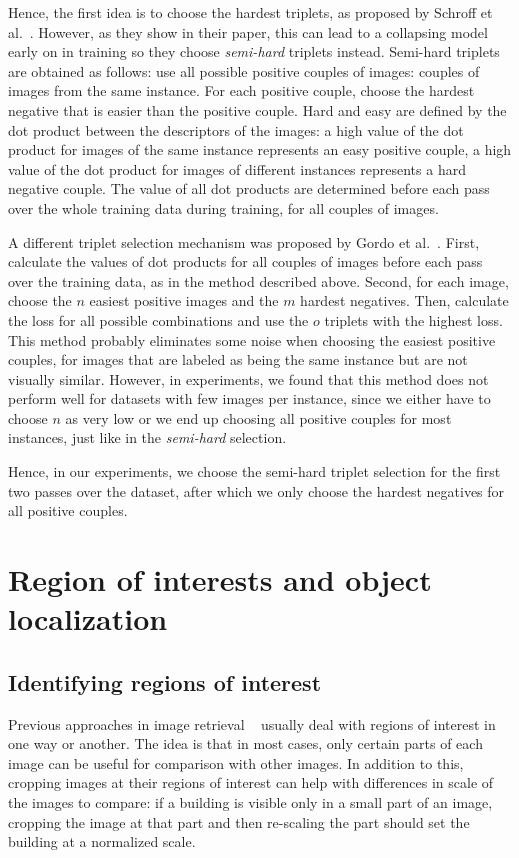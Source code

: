Hence, the first idea is to choose the hardest triplets, as proposed by
Schroff et al.~\cite{schroff_facenet:_2015}. However, as they show in
their paper, this can lead to a collapsing model early on in training
so they choose \emph{semi-hard} triplets instead. Semi-hard triplets
are obtained as follows:
use all possible positive couples of images: couples of images from the
same instance. For each positive couple, choose the hardest negative
that is easier than the positive couple. Hard and easy are defined
by the dot product between the descriptors of the images: a high value
of the dot product for images of the same instance represents an easy
positive couple, a high value of the dot product for images of different
instances represents a hard negative couple.
The value of all dot products are determined before each pass over
the whole training data during training, for all couples of images.

A different triplet selection mechanism was proposed by
Gordo et al.~\cite{gordo_end--end_2017}.
First, calculate the values of dot products for all couples of
images before each pass over the training data, as in the method described
above.
Second, for each image, choose the $n$ easiest positive images and the
$m$ hardest negatives. Then, calculate the loss for all possible combinations
and use the $o$ triplets with the highest loss.
This method probably eliminates some noise when choosing the easiest
positive couples, for images that are labeled as being the same instance
but are not visually similar.
However, in experiments, we found that this method does not perform well
for datasets with few images per instance, since we either have to
choose $n$ as very low or we end up choosing all positive couples for
most instances, just like in the \emph{semi-hard} selection.

Hence, in our experiments, we choose the semi-hard triplet selection
for the first two passes over the dataset, after which we only choose
the hardest negatives for all positive couples.

\section{Region of interests and object localization}\label{sec:analysisprev}
\subsection{Identifying regions of interest}\label{sec:roi}
Previous approaches in image retrieval
~\cite{gordo_end--end_2017,salvador_faster_2016,tolias_particular_2015}
usually deal with regions of interest in one way or another.
The idea is that in most cases, only certain parts of each image can
be useful for comparison with other images. In addition to this,
cropping images at their regions of interest can help with differences
in scale of the images to compare: if a building is visible only in a small
part of an image, cropping the image at that part and then re-scaling
the part should set the building at a normalized scale.

